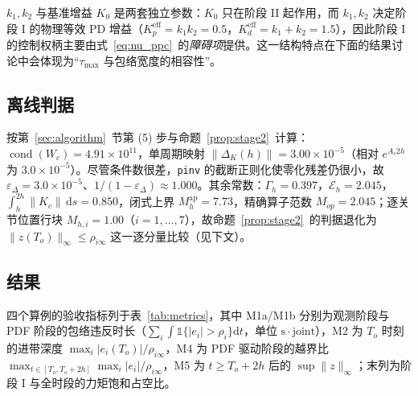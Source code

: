 \(k_1,k_2\) 与基准增益 \(K_0\) 是两套独立参数：\(K_0\) 只在阶段 II 起作用，而 \(k_1,k_2\) 决定阶段 I 的物理等效 PD 增益（\(K_p^{\mathrm{eff}}=k_1k_2=0.5\)，\(K_d^{\mathrm{eff}}=k_1+k_2=1.5\)），因此阶段 I 的控制权柄主要由式~\eqref{eq:nu_ppc}~的\emph{障碍项}提供。这一结构特点在下面的结果讨论中会体现为“\(\tau_{\max}\) 与包络宽度的相容性”。

\subsection{离线判据}
\label{sec:sim_offline}

按第~\ref{sec:algorithm}~节第 (5) 步与命题~\ref{prop:stage2}~计算：\(\operatorname{cond}(W_c)=4.91\times10^{11}\)，单周期映射 \(\lVert\Delta_K(h)\rVert=3.00\times10^{-5}\)（相对 \(e^{A_c2h}\) 为 \(3.0\times10^{-5}\)）。尽管条件数很差，\texttt{pinv} 的截断正则化使零化残差仍很小，故 \(\varepsilon_\Delta=3.0\times10^{-5}\)、\(1/(1-\varepsilon_\Delta)\approx1.000\)。其余常数：\(\Gamma_h=0.397\)，\(\mathcal E_h=2.045\)，\(\int_h^{2h}\lVert K_c\rVert\,\mathrm ds=0.850\)，闭式上界 \(M_h^{\mathrm{ap}}=7.73\)，精确算子范数 \(M_{op}=2.045\)；逐关节位置行块 \(M_{h,i}=1.00\)（\(i=1,\dots,7\)），故命题~\ref{prop:stage2}~的判据退化为 \(\lVert z(T_o)\rVert_\infty\le\rho_{i\infty}\) 这一逐分量比较（见下文）。

\subsection{结果}
\label{sec:sim_results}

四个算例的验收指标列于表~\ref{tab:metrics}，其中 M1a/M1b 分别为观测阶段与 PDF 阶段的包络违反时长（\(\sum_i\int\mathbb 1\{\lvert e_i\rvert>\rho_i\}\mathrm dt\)，单位 \(\mathrm{s\cdot joint}\)），M2 为 \(T_o\) 时刻的进带深度 \(\max_i\lvert e_i(T_o)\rvert/\rho_{i\infty}\)，M4 为 PDF 驱动阶段的越界比 \(\max_{t\in[T_o,T_o+2h]}\max_i\lvert e_i\rvert/\rho_{i\infty}\)，M5 为 \(t\ge T_o+2h\) 后的 \(\sup\lVert z\rVert_\infty\)；末列为阶段 I 与全时段的力矩饱和占空比。

